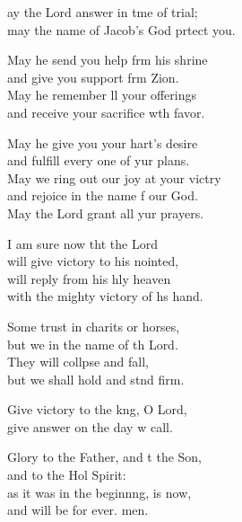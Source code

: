 \settowidth{\versewidth}{May we ring out our joy at your victory +}
\begin{psalmverse}%
  \begin{patverse}
ay the Lord answer in t\pointup{\i}me of trial;\Med\\
may the name of Jacob’s God prtect you.

May he send you help frm his shrine\Med\\
and give you support frm Zion.\\
May he remember ll your offerings\Med\\
and receive your sacrifice w\pointup{\i}th favor.

May he give you your hart’s desire\Med\\
and fulfill every one of yur plans.\\
May we ring out our joy at your victry\Flex\\
and rejoice in the name f our God.\Med\\
May the Lord grant all yur prayers.

I am sure now tht the Lord\Med\\
will give victory to his nointed,\\
will reply from his hly heaven\Med\\
with the mighty victory of h\pointup{\i}s hand.

Some trust in charits or horses,\Med\\
but we in the name of th Lord.\\
They will collpse and fall,\Med\\
but we shall hold and stnd firm.

Give victory to the k\pointup{\i}ng, O Lord,\Med\\
give answer on the day w call.

Glory to the Father, and t the Son,\Med\\
and to the Hol Spirit:\\
as it was in the beginn\pointup{\i}ng, is now,\Med\\
and will be for ever. men.
  \end{patverse}
\end{psalmverse}
